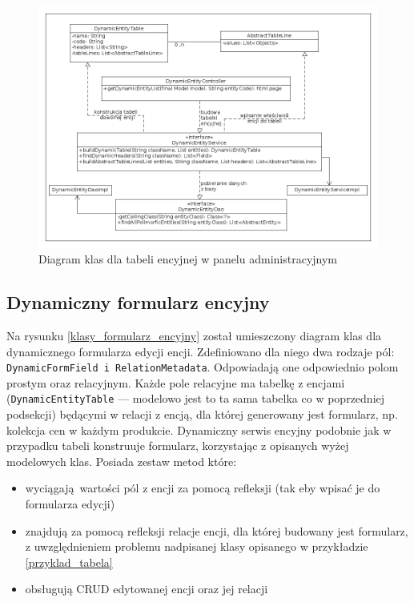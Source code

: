 \begin{figure}
	\begin{center}
		\includegraphics[scale=0.4]{klasy_tabela_encyjna.png}
	\end{center}
	\caption{{\color{black}Diagram klas dla tabeli encyjnej w panelu administracyjnym}} \label{klasy_tabela_encyjna}
\end{figure}

\subsection{Dynamiczny formularz encyjny}
Na rysunku \ref{klasy_formularz_encyjny} został umieszczony diagram klas dla dynamicznego formularza edycji encji. Zdefiniowano dla niego dwa rodzaje pól: \texttt{DynamicFormField i RelationMetadata}. Odpowiadają one odpowiednio polom prostym oraz relacyjnym. Każde pole relacyjne ma tabelkę z encjami (\texttt{DynamicEntityTable} — modelowo jest to ta sama tabelka co w poprzedniej podsekcji) będącymi w relacji z encją, dla której generowany jest formularz, np. kolekcja cen w każdym produkcie. Dynamiczny serwis encyjny podobnie jak w przypadku tabeli konstruuje formularz, korzystając z opisanych wyżej modelowych klas. Posiada zestaw metod które:
\begin{itemize}
	\item wyciągają wartości pól z encji za pomocą refleksji (tak eby wpisać je do formularza edycji)
	\item znajdują za pomocą refleksji relacje encji, dla której budowany jest formularz, z uwzględnieniem problemu nadpisanej klasy opisanego w przykładzie \ref{przyklad_tabela}
	\item obsługują CRUD edytowanej encji oraz jej relacji 
\end{itemize}  

